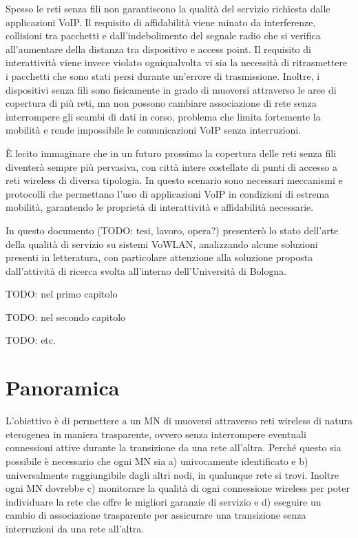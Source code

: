 \documentclass[12pt,a4paper,openright,twoside]{book}
\begin{document}
Spesso le reti senza fili non garantiscono la qualità del servizio
richiesta dalle applicazioni VoIP. Il requisito di affidabilità viene
minato da interferenze, collisioni tra pacchetti e dall'indebolimento
del segnale radio che si verifica all'aumentare della distanza tra
dispositivo e access point. Il requisito di interattività viene invece
violato ogniqualvolta vi sia la necessità di ritrasmettere i pacchetti
che sono stati persi durante un'errore di trasmissione. Inoltre, i
dispositivi senza fili sono fisicamente in grado di muoversi
attraverso le aree di copertura di più reti, ma non possono cambiare
associazione di rete senza interrompere gli scambi di dati in corso,
problema che limita fortemente la mobilità e rende impossibile le
comunicazioni VoIP senza interruzioni.

È lecito immaginare che in un futuro prossimo la copertura delle reti
senza fili diventerà sempre più pervasiva, con città intere costellate
di punti di accesso a reti wireless di diversa tipologia. In questo
scenario sono necessari meccanismi e protocolli che permettano l'uso
di applicazioni VoIP in condizioni di estrema mobilità, garantendo le
proprietà di interattività e affidabilità necessarie.

In questo documento (TODO: tesi, lavoro, opera?) presenterò lo stato
dell'arte della qualità di servizio su sistemi VoWLAN, analizzando
alcune soluzioni presenti in letteratura, con particolare attenzione
alla soluzione proposta dall'attività di ricerca svolta all'interno
dell'Università di Bologna.

TODO: nel primo capitolo

TODO: nel secondo capitolo

TODO: etc.

\clearpage{\pagestyle{empty}\cleardoublepage}

\tableofcontents
\rhead[\fancyplain{}{\bfseries\leftmark}]{\fancyplain{}{\bfseries\thepage}}
\clearpage{\pagestyle{empty}\cleardoublepage}

\chapter{Panoramica}
\lhead[\fancyplain{}{\bfseries\thepage}]{\fancyplain{}{\bfseries\rightmark}}
L'obiettivo è di permettere a un MN di muoversi attraverso reti
wireless di natura eterogenea in maniera trasparente, ovvero senza
interrompere eventuali connessioni attive durante la transizione da
una rete all'altra. Perché questo sia possibile è necessario che ogni
MN sia a) univocamente identificato e b) universalmente raggiungibile
dagli altri nodi, in qualunque rete si trovi. Inoltre ogni MN dovrebbe
c) monitorare la qualità di ogni connessione wireless per poter
individuare la rete che offre le migliori garanzie di servizio e d)
eseguire un cambio di associazione trasparente per assicurare una
transizione senza interruzioni da una rete all'altra.
\end{document}
